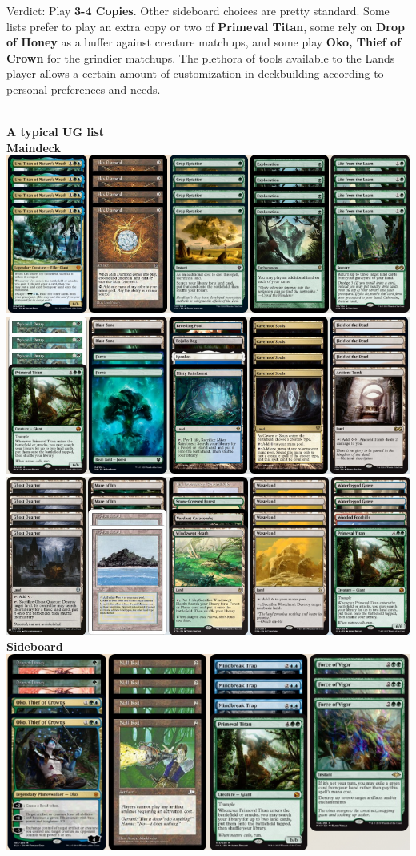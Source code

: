 \documentclass{report}
\begin{document}
Verdict: Play \textbf{3-4 Copies}.
Other sideboard choices are pretty standard. Some lists prefer to play an extra copy or two of \textbf{Primeval Titan}, some rely on \textbf{Drop of Honey} as a buffer against creature matchups, and some play \textbf{Oko, Thief of Crown} for the grindier matchups. The plethora of tools available to the Lands player allows a certain amount of customization in deckbuilding according to personal preferences and needs.\\\\
\newpage
\begin{center}
\textbf{A typical UG list\\}
\textbf{Maindeck\\}
\includegraphics [width =\textwidth] {uglands1}
\includegraphics [width =\textwidth] {uglands2}
\includegraphics [width =\textwidth] {uglands3}
\newpage
\textbf{Sideboard\\}
\includegraphics [width =\textwidth] {uglandssb}
\end{center}
\end{document}
